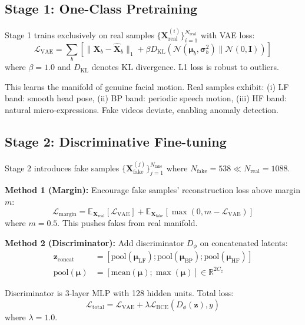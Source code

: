 \documentclass[10pt,twocolumn,letterpaper]{article}
\begin{document}
\subsection{Stage 1: One-Class Pretraining}

Stage 1 trains exclusively on real samples $\{\mathbf{X}^{(i)}_{\text{real}}\}_{i=1}^{N_{\text{real}}}$ with VAE loss:
\begin{equation}
\mathcal{L}_{\text{VAE}} = \sum_{b} \left[ \|\mathbf{X}_b - \hat{\mathbf{X}}_b\|_1 + \beta D_{\text{KL}}(\mathcal{N}(\boldsymbol{\mu}_b, \boldsymbol{\sigma}^2_b) \| \mathcal{N}(0, \mathbf{I})) \right]
\end{equation}
where $\beta=1.0$ and $D_{\text{KL}}$ denotes KL divergence. L1 loss is robust to outliers.

This learns the manifold of genuine facial motion. Real samples exhibit: (i) LF band: smooth head pose, (ii) BP band: periodic speech motion, (iii) HF band: natural micro-expressions. Fake videos deviate, enabling anomaly detection.

\subsection{Stage 2: Discriminative Fine-tuning}

Stage 2 introduces fake samples $\{\mathbf{X}^{(j)}_{\text{fake}}\}_{j=1}^{N_{\text{fake}}}$ where $N_{\text{fake}} = 538 \ll N_{\text{real}} = 1088$.

\textbf{Method 1 (Margin):} Encourage fake samples' reconstruction loss above margin $m$:
\begin{equation}
\mathcal{L}_{\text{margin}} = \mathbb{E}_{\mathbf{X}_{\text{real}}}[\mathcal{L}_{\text{VAE}}] + \mathbb{E}_{\mathbf{X}_{\text{fake}}}[\max(0, m - \mathcal{L}_{\text{VAE}})]
\end{equation}
where $m=0.5$. This pushes fakes from real manifold.

\textbf{Method 2 (Discriminator):} Add discriminator $D_\phi$ on concatenated latents:
\begin{align}
    \mathbf{z}_{\text{concat}} &= [\text{pool}(\boldsymbol{\mu}_{\text{LF}}); \text{pool}(\boldsymbol{\mu}_{\text{BP}}); \text{pool}(\boldsymbol{\mu}_{\text{HF}})] \\
    \text{pool}(\boldsymbol{\mu}) &= [\text{mean}(\boldsymbol{\mu}); \max(\boldsymbol{\mu})] \in \mathbb{R}^{2C_z}
\end{align}

Discriminator is 3-layer MLP with 128 hidden units. Total loss:
\begin{equation}
\mathcal{L}_{\text{total}} = \mathcal{L}_{\text{VAE}} + \lambda \mathcal{L}_{\text{BCE}}(D_\phi(\mathbf{z}), y)
\end{equation}
where $\lambda=1.0$.
\end{document}
